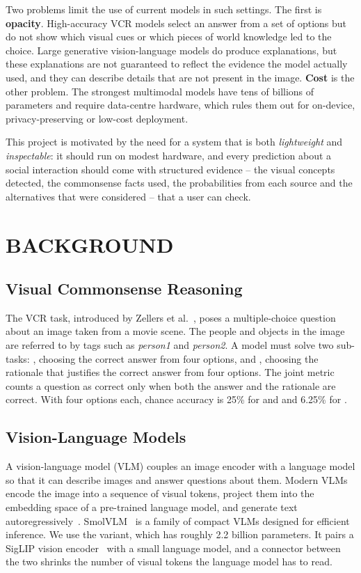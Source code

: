 Two problems limit the use of current models in such settings. The first is \textbf{opacity}. High-accuracy VCR models select an answer from a set of options but do not show which visual cues or which pieces of world knowledge led to the choice. Large generative vision-language models do produce explanations, but these explanations are not guaranteed to reflect the evidence the model actually used, and they can describe details that are not present in the image. \textbf{Cost} is the other problem. The strongest multimodal models have tens of billions of parameters and require data-centre hardware, which rules them out for on-device, privacy-preserving or low-cost deployment.

This project is motivated by the need for a system that is both \emph{lightweight} and \emph{inspectable}: it should run on modest hardware, and every prediction about a social interaction should come with structured evidence -- the visual concepts detected, the commonsense facts used, the probabilities from each source and the alternatives that were considered -- that a user can check.

\section{BACKGROUND}

\subsection{Visual Commonsense Reasoning}

The VCR task, introduced by Zellers et al.~\cite{zellers2019vcr}, poses a multiple-choice question about an image taken from a movie scene. The people and objects in the image are referred to by tags such as \emph{person1} and \emph{person2}. A model must solve two sub-tasks: \QtoA, choosing the correct answer from four options, and \QAtoR, choosing the rationale that justifies the correct answer from four options. The joint metric \QtoAR{} counts a question as correct only when both the answer and the rationale are correct. With four options each, chance accuracy is 25\% for \QtoA{} and \QAtoR{} and 6.25\% for \QtoAR.

\subsection{Vision-Language Models}

A vision-language model (VLM) couples an image encoder with a language model so that it can describe images and answer questions about them. Modern VLMs encode the image into a sequence of visual tokens, project them into the embedding space of a pre-trained language model, and generate text autoregressively~\cite{liu2023llava,li2023blip2}. SmolVLM~\cite{marafioti2025smolvlm} is a family of compact VLMs designed for efficient inference. We use the  variant, which has roughly 2.2 billion parameters. It pairs a SigLIP vision encoder~\cite{zhai2023siglip} with a small language model, and a connector between the two shrinks the number of visual tokens the language model has to read.

